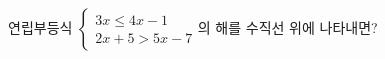 연립부등식 $\begin{cases} 3x\le 4x-1 \\ 2x+5>5x-7 \end{cases}$의 해를 수직선 위에 나타내면?
\begin{choicesii}{}{}{}{}{}\end{choicesii}
